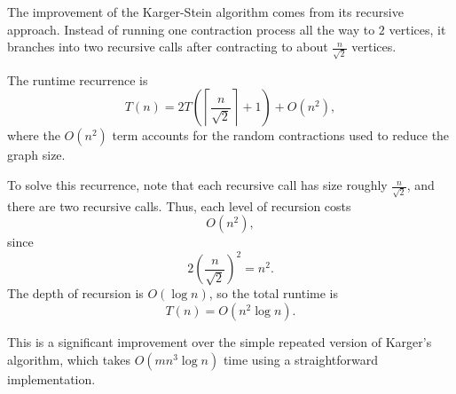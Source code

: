 \documentclass[14pt]{extreport}
\begin{document}
    The improvement of the Karger-Stein algorithm comes from its recursive approach. Instead of running one contraction process all the way to $2$ vertices, it branches into two recursive calls after contracting to about $\frac{n}{\sqrt{2}}$ vertices.

    \vspace{4mm}

    The runtime recurrence is
    \begin{equation}
        T(n) = 2T\left(\left\lceil \frac{n}{\sqrt{2}} \right\rceil + 1\right) + O(n^2),
    \end{equation}
    where the $O(n^2)$ term accounts for the random contractions used to reduce the graph size.

    \vspace{4mm}

    To solve this recurrence, note that each recursive call has size roughly $\frac{n}{\sqrt{2}}$, and there are two recursive calls. Thus, each level of recursion costs
    $$
    O(n^2),
    $$
    since
    $$
    2 \left(\frac{n}{\sqrt{2}}\right)^2 = n^2.
    $$
    The depth of recursion is $O(\log n)$, so the total runtime is
    $$
    T(n) = O(n^2 \log n).
    $$

    This is a significant improvement over the simple repeated version of Karger's algorithm, which takes $O(mn^3 \log n)$ time using a straightforward implementation.

\end{document}

